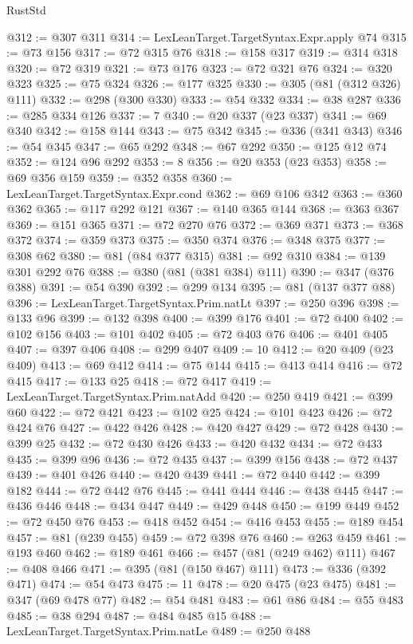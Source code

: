 \begin{lexlean}{RustStd}
\begin{coremodule}
@312 := @307 @311
@314 := LexLeanTarget.TargetSyntax.Expr.apply @74
@315 := @73 @156
@317 := @72 @315 @76
@318 := @158 @317
@319 := @314 @318
@320 := @72 @319
@321 := @73 @176
@323 := @72 @321 @76
@324 := @320 @323
@325 := @75 @324
@326 := @177 @325
@330 := @305 (@81 (@312 @326) @111)
@332 := @298 (@300 @330)
@333 := @54 @332
@334 := @38 @287
@336 := @285 @334 @126
@337 := 7
@340 := @20 @337 (@23 @337)
@341 := @69 @340
@342 := @158 @144
@343 := @75 @342
@345 := @336 (@341 @343)
@346 := @54 @345
@347 := @65 @292
@348 := @67 @292
@350 := @125 @12 @74
@352 := @124 @96 @292
@353 := 8
@356 := @20 @353 (@23 @353)
@358 := @69 @356 @159
@359 := @352 @358
@360 := LexLeanTarget.TargetSyntax.Expr.cond
@362 := @69 @106 @342
@363 := @360 @362
@365 := @117 @292 @121
@367 := @140 @365 @144
@368 := @363 @367
@369 := @151 @365
@371 := @72 @270 @76
@372 := @369 @371
@373 := @368 @372
@374 := @359 @373
@375 := @350 @374
@376 := @348 @375
@377 := @308 @62
@380 := @81 (@84 @377 @315)
@381 := @92 @310
@384 := @139 @301 @292 @76
@388 := @380 (@81 (@381 @384) @111)
@390 := @347 (@376 @388)
@391 := @54 @390
@392 := @299 @134
@395 := @81 (@137 @377 @88)
@396 := LexLeanTarget.TargetSyntax.Prim.natLt
@397 := @250 @396
@398 := @133 @96
@399 := @132 @398
@400 := @399 @176
@401 := @72 @400
@402 := @102 @156
@403 := @101 @402
@405 := @72 @403 @76
@406 := @401 @405
@407 := @397 @406
@408 := @299 @407
@409 := 10
@412 := @20 @409 (@23 @409)
@413 := @69 @412
@414 := @75 @144
@415 := @413 @414
@416 := @72 @415
@417 := @133 @25
@418 := @72 @417
@419 := LexLeanTarget.TargetSyntax.Prim.natAdd
@420 := @250 @419
@421 := @399 @60
@422 := @72 @421
@423 := @102 @25
@424 := @101 @423
@426 := @72 @424 @76
@427 := @422 @426
@428 := @420 @427
@429 := @72 @428
@430 := @399 @25
@432 := @72 @430 @426
@433 := @420 @432
@434 := @72 @433
@435 := @399 @96
@436 := @72 @435
@437 := @399 @156
@438 := @72 @437
@439 := @401 @426
@440 := @420 @439
@441 := @72 @440
@442 := @399 @182
@444 := @72 @442 @76
@445 := @441 @444
@446 := @438 @445
@447 := @436 @446
@448 := @434 @447
@449 := @429 @448
@450 := @199 @449
@452 := @72 @450 @76
@453 := @418 @452
@454 := @416 @453
@455 := @189 @454
@457 := @81 (@239 @455)
@459 := @72 @398 @76
@460 := @263 @459
@461 := @193 @460
@462 := @189 @461
@466 := @457 (@81 (@249 @462) @111)
@467 := @408 @466
@471 := @395 (@81 (@150 @467) @111)
@473 := @336 (@392 @471)
@474 := @54 @473
@475 := 11
@478 := @20 @475 (@23 @475)
@481 := @347 (@69 @478 @77)
@482 := @54 @481
@483 := @61 @86
@484 := @55 @483
@485 := @38 @294
@487 := @484 @485 @15
@488 := LexLeanTarget.TargetSyntax.Prim.natLe
@489 := @250 @488

\end{coremodule}
\end{lexlean}
